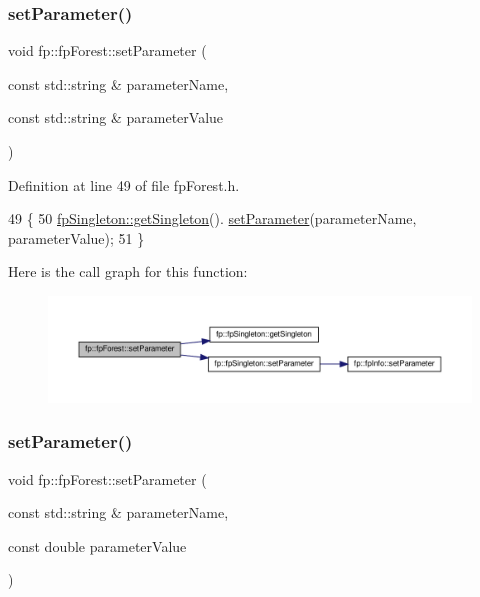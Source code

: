 \subsubsection{\texorpdfstring{set\+Parameter()}{setParameter()}\hspace{0.1cm}{\footnotesize\ttfamily [1/3]}}
{\footnotesize\ttfamily void fp\+::fp\+Forest\+::set\+Parameter (\begin{DoxyParamCaption}\item[{const std\+::string \&}]{parameter\+Name,  }\item[{const std\+::string \&}]{parameter\+Value }\end{DoxyParamCaption})\hspace{0.3cm}{\ttfamily [inline]}}



Definition at line 49 of file fp\+Forest.\+h.


\begin{DoxyCode}
49                                                                                                      \{
50                 \hyperlink{classfp_1_1fpSingleton_a8bdae77b68521003e3fc630edec2e240}{fpSingleton::getSingleton}().
      \hyperlink{classfp_1_1fpSingleton_a90f275b256694ea7b16577d547a33044}{setParameter}(parameterName, parameterValue);    
51             \}
\end{DoxyCode}
Here is the call graph for this function\+:\nopagebreak
\begin{figure}[H]
\begin{center}
\leavevmode
\includegraphics[width=350pt]{classfp_1_1fpForest_ad13bbbd33291ef5f523691eccc23aece_cgraph}
\end{center}
\end{figure}
\mbox{\label{classfp_1_1fpForest_afc7a14e083aaae0dbd90ef0a30c48c21}} 
\subsubsection{\texorpdfstring{set\+Parameter()}{setParameter()}\hspace{0.1cm}{\footnotesize\ttfamily [2/3]}}
{\footnotesize\ttfamily void fp\+::fp\+Forest\+::set\+Parameter (\begin{DoxyParamCaption}\item[{const std\+::string \&}]{parameter\+Name,  }\item[{const double}]{parameter\+Value }\end{DoxyParamCaption})\hspace{0.3cm}{\ttfamily [inline]}}



